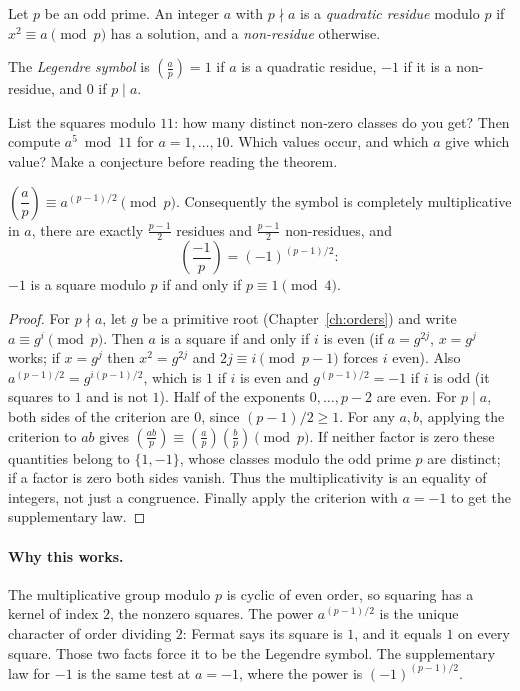 Let $p$ be an odd prime. An integer $a$ with $p\nmid a$ is a \emph{quadratic residue} modulo $p$ if $x^2\equiv a\pmod p$ has a solution, and a \emph{non-residue} otherwise.

\begin{definition}
The \emph{Legendre symbol} is $\left(\frac ap\right)=1$ if $a$ is a quadratic residue, $-1$ if it is a non-residue, and $0$ if $p\mid a$.
\end{definition}

\begin{think}
List the squares modulo $11$: how many distinct non-zero classes do you get? Then compute $a^5\bmod11$ for $a=1,\dots,10$. Which values occur, and which $a$ give which value? Make a conjecture before reading the theorem.
\end{think}

\begin{theorem}\label{thm:eulercrit}
$\left(\dfrac ap\right)\equiv a^{(p-1)/2}\pmod p$. Consequently the symbol is completely multiplicative in $a$, there are exactly $\frac{p-1}2$ residues and $\frac{p-1}2$ non-residues, and
\[
\left(\frac{-1}p\right)=(-1)^{(p-1)/2}:
\]
$-1$ is a square modulo $p$ if and only if $p\equiv1\pmod4$.
\end{theorem}
\begin{proof}
For $p\nmid a$, let $g$ be a primitive root (Chapter~\ref{ch:orders}) and write $a\equiv g^i\pmod p$. Then $a$ is a square if and only if $i$ is even (if $a=g^{2j}$, $x=g^j$ works; if $x=g^j$ then $x^2=g^{2j}$ and $2j\equiv i\pmod{p-1}$ forces $i$ even). Also $a^{(p-1)/2}=g^{i(p-1)/2}$, which is $1$ if $i$ is even and $g^{(p-1)/2}=-1$ if $i$ is odd (it squares to $1$ and is not $1$). Half of the exponents $0,\dots,p-2$ are even.
For $p\mid a$, both sides of the criterion are $0$, since $(p-1)/2\ge1$.
For any $a,b$, applying the criterion to $ab$ gives
$\left(\frac{ab}p\right)\equiv
\left(\frac ap\right)\left(\frac bp\right)\pmod p$.
If neither factor is zero these quantities belong to $\{1,-1\}$, whose
classes modulo the odd prime $p$ are distinct; if a factor is zero both
sides vanish. Thus the multiplicativity is an equality of integers, not just
a congruence. Finally apply the criterion with $a=-1$ to get the supplementary law.
\end{proof}

\paragraph{Why this works.}
The multiplicative group modulo $p$ is cyclic of even order, so squaring has a kernel of index $2$, the nonzero squares. The power $a^{(p-1)/2}$ is the unique character of order dividing $2$: Fermat says its square is $1$, and it equals $1$ on every square. Those two facts force it to be the Legendre symbol. The supplementary law for $-1$ is the same test at $a=-1$, where the power is $(-1)^{(p-1)/2}$.


